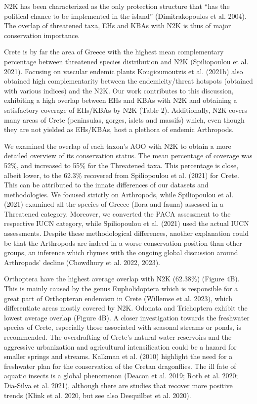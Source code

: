 N2K has been characterized as the only protection structure that “has the
political chance to be implemented in the island” (Dimitrakopoulos et al. 2004).
The overlap of threatened taxa, EHs and KBAs with N2K is thus of major
conservation importance. 

Crete is by far the area of Greece with the highest mean complementary
percentage between threatened species distribution and N2K (Spiliopoulou et al. 2021).
Focusing on vascular endemic plants Kougioumoutzis et al. (2021b) also obtained
high complementarity between the endemicity/threat hotspots
(obtained with various indices) and the N2K. Our work contributes to this
discussion, exhibiting a high overlap between EHs and KBAs with N2K and
obtaining a satisfactory coverage of  EHs/KBAs by N2K (Table 2).
Additionally, N2K covers many areas of Crete (peninsulas, gorges, islets and
massifs) which, even though they are not yielded as EHs/KBAs, host a plethora
of endemic Arthropods.

We examined the overlap of each taxon’s AOO with N2K to obtain a more detailed
overview of its conservation status. The mean percentage of coverage was 52\%,
and increased to 55\% for the Threatened taxa. This percentage is close, albeit
lower, to the 62.3\% recovered from Spiliopoulou et al. (2021) for Crete. This
can be attributed to the innate differences of our datasets and methodologies.
We focused strictly on Arthropods, while Spiliopoulou et al. (2021) examined
all the species of Greece (flora and fauna) assessed in a Threatened category.
Moreover, we converted the PACA assessment to the respective IUCN category,
while Spiliopoulou et al. (2021) used the actual IUCN assessments. Despite
these methodological differences, another explanation could be that the
Arthropods are indeed in a worse conservation position than other groups, an
inference which rhymes with the ongoing global discussion around Arthropods’
decline (Chowdhury et al. 2022, 2023).

Orthoptera have the highest average overlap with N2K (62.38\%) (Figure 4B).
This is mainly caused by the genus Eupholidoptera which is responsible for a
great part of Orthopteran endemism in Crete (Willemse et al. 2023), which
differentiate areas mostly covered by N2K. Odonata and Trichoptera exhibit the
lowest average overlap (Figure 4B). A closer investigation towards the
freshwater species of Crete, especially those associated with seasonal streams
or ponds, is recommended. The overdrafting of Crete’s natural water reservoirs
and the aggressive urbanization and agricultural intensification could be a
hazard for smaller springs and streams. Kalkman et al. (2010) highlight the
need for a freshwater plan for the conservation of the Cretan dragonflies.
The ill fate of aquatic insects is a global phenomenon (Deacon et al. 2019; Roth et al. 2020; Dia-Silva et al. 2021),
although there are studies that recover more positive trends (Klink et al. 2020, but see also Desquilbet et al. 2020).

